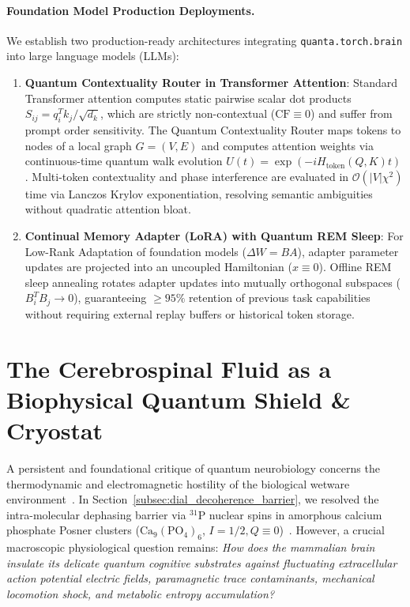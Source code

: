 \documentclass[10pt,twocolumn,3p]{article}
\begin{document}
\paragraph{Foundation Model Production Deployments.}
We establish two production-ready architectures integrating \texttt{quanta.torch.brain} into large language models (LLMs):
\begin{enumerate}
    \item \textbf{Quantum Contextuality Router in Transformer Attention}: Standard Transformer attention computes static pairwise scalar dot products $S_{ij} = q_i^T k_j / \sqrt{d_k}$, which are strictly non-contextual ($\text{CF} \equiv 0$) and suffer from prompt order sensitivity. The Quantum Contextuality Router maps tokens to nodes of a local graph $G = (V, E)$ and computes attention weights via continuous-time quantum walk evolution $U(t) = \exp(-i H_{\text{token}}(Q, K) t)$. Multi-token contextuality and phase interference are evaluated in $\mathcal{O}(|V| \chi^2)$ time via Lanczos Krylov exponentiation, resolving semantic ambiguities without quadratic attention bloat.
    \item \textbf{Continual Memory Adapter (LoRA) with Quantum REM Sleep}: For Low-Rank Adaptation of foundation models ($\Delta W = B A$), adapter parameter updates are projected into an uncoupled Hamiltonian ($x \equiv 0$). Offline REM sleep annealing rotates adapter updates into mutually orthogonal subspaces ($B_i^T B_j \to 0$), guaranteeing $\ge 95\%$ retention of previous task capabilities without requiring external replay buffers or historical token storage.
\end{enumerate}


\section{The Cerebrospinal Fluid as a Biophysical Quantum Shield \& Cryostat}
\label{sec:csf_shielding}

A persistent and foundational critique of quantum neurobiology concerns the thermodynamic and electromagnetic hostility of the biological wetware environment~\cite{tegmark2000}. In Section~\ref{subsec:dial_decoherence_barrier}, we resolved the intra-molecular dephasing barrier via $^{31}\text{P}$ nuclear spins in amorphous calcium phosphate Posner clusters ($\text{Ca}_9(\text{PO}_4)_6$, $I=1/2, Q \equiv 0$)~\cite{fisher2015,swift2018}. However, a crucial macroscopic physiological question remains: \textit{How does the mammalian brain insulate its delicate quantum cognitive substrates against fluctuating extracellular action potential electric fields, paramagnetic trace contaminants, mechanical locomotion shock, and metabolic entropy accumulation?}
\end{document}
